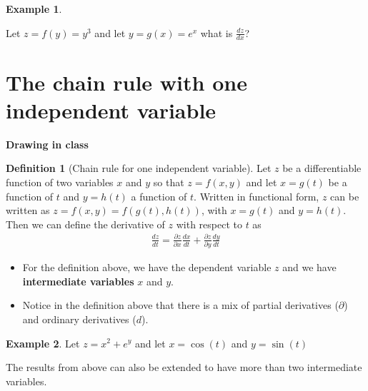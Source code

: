 \documentclass[
]{book}
\theoremstyle{definition}
\newtheorem{definition}{Definition}[chapter]
\theoremstyle{definition}
\newtheorem{example}{Example}[chapter]
\theoremstyle{definition}
\theoremstyle{remark}
\begin{document}
\begin{example}
\protect\hypertarget{exm:unlabeled-div-217}{}\label{exm:unlabeled-div-217}

Let \(z = f(y) = y^3\) and let \(y = g(x) = e^{x}\) what is \(\frac{dz}{dx}\)?

\end{example}

\hypertarget{the-chain-rule-with-one-independent-variable}{%
\section{The chain rule with one independent variable}\label{the-chain-rule-with-one-independent-variable}}

\textbf{Drawing in class}

\begin{definition}[Chain rule for one independent variable]
\protect\hypertarget{def:unnamed-chunk-280}{}{\label{def:unnamed-chunk-280} {} }Let \(z\) be a differentiable function of two variables \(x\) and \(y\) so that \(z = f(x, y)\) and let \(x=g(t)\) be a function of \(t\) and \(y=h(t)\) a function of \(t\). Written in functional form, \(z\) can be written as \(z = f(x, y) = f(g(t), h(t))\), with \(x=g(t)\) and \(y=h(t)\). Then we can define the derivative of \(z\) with respect to \(t\) as
\[
\begin{aligned}
\frac{dz}{dt} = \frac{\partial z}{ \partial x}\frac{dx}{dt} + \frac{\partial z}{\partial y}\frac{dy}{dt}
\end{aligned}
\]

\begin{itemize}
\item
  For the definition above, we have the dependent variable \(z\) and we have \textbf{intermediate variables} \(x\) and \(y\).
\item
  Notice in the definition above that there is a mix of partial derivatives (\(\partial\)) and ordinary derivatives (\(d\)).
\end{itemize}
\end{definition}

\begin{example}
\protect\hypertarget{exm:unnamed-chunk-281}{}{\label{exm:unnamed-chunk-281} }Let \(z = x^2 + e^y\) and let \(x = \cos(t)\) and \(y = \sin(t)\)
\end{example}

The results from above can also be extended to have more than two intermediate variables.
\end{document}

